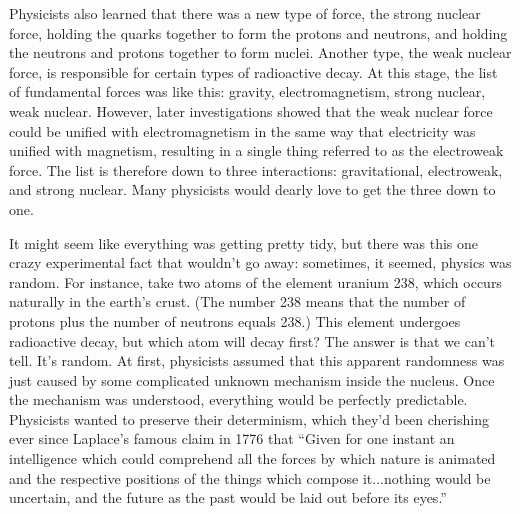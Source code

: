 Physicists also learned that there was a new type of force, the strong nuclear force,
holding the quarks together to form the protons and neutrons, and holding the neutrons and
protons together to form nuclei. Another type, the weak nuclear force, is responsible
for
certain types of radioactive decay. At this stage, the list of fundamental forces was like this:
gravity, electromagnetism, strong nuclear, weak nuclear. However, later investigations showed
that the weak nuclear force could be unified with electromagnetism in the same way that
electricity was unified with magnetism, resulting in a single thing referred to as the
electroweak force. The list is therefore down to three interactions: gravitational, electroweak,
and strong nuclear. Many physicists would dearly love to get the three down to one.

It might seem like everything was getting pretty tidy, but there was this one crazy experimental
fact that wouldn't go away: sometimes, it seemed, physics was random. For instance, take
two atoms of the element uranium 238, which occurs naturally in the earth's crust. (The number
238 means that the number of protons plus the number of neutrons equals 238.) This
element undergoes radioactive decay, but which atom will decay first? The answer is that we
can't tell. It's random. At first, physicists assumed that this apparent randomness was
just caused by some complicated unknown mechanism inside the nucleus. Once the mechanism
was understood, everything would be perfectly predictable. Physicists wanted to preserve
their determinism, which they'd been cherishing ever since Laplace's famous claim in 1776 that
``Given for one instant an intelligence which could comprehend all the forces by which nature
is animated and the respective positions of the things which compose it...nothing would be
uncertain, and the future as the past would be laid out before its eyes.''


